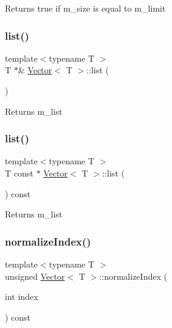 \begin{DoxyReturn}{Returns}
true if m\+\_\+size is equal to m\+\_\+limit 
\end{DoxyReturn}
\mbox{\label{classVector_aad3f85e26470d99139e3f96053bdacc4}} 
\subsubsection{\texorpdfstring{list()}{list()}\hspace{0.1cm}{\footnotesize\ttfamily [1/2]}}
{\footnotesize\ttfamily template$<$typename T $>$ \\
T $\ast$\& \hyperlink{classVector}{Vector}$<$ T $>$\+::list (\begin{DoxyParamCaption}{ }\end{DoxyParamCaption})\hspace{0.3cm}{\ttfamily [protected]}}

\begin{DoxyReturn}{Returns}
m\+\_\+list 
\end{DoxyReturn}
\mbox{\label{classVector_a2aaf129778179680e5932d96aa5471eb}} 
\subsubsection{\texorpdfstring{list()}{list()}\hspace{0.1cm}{\footnotesize\ttfamily [2/2]}}
{\footnotesize\ttfamily template$<$typename T $>$ \\
T const  $\ast$ \hyperlink{classVector}{Vector}$<$ T $>$\+::list (\begin{DoxyParamCaption}{ }\end{DoxyParamCaption}) const\hspace{0.3cm}{\ttfamily [protected]}}

\begin{DoxyReturn}{Returns}
m\+\_\+list 
\end{DoxyReturn}
\mbox{\label{classVector_a63f7ddd7328b13bc30b2243b50f70ec9}} 
\subsubsection{\texorpdfstring{normalize\+Index()}{normalizeIndex()}}
{\footnotesize\ttfamily template$<$typename T $>$ \\
unsigned \hyperlink{classVector}{Vector}$<$ T $>$\+::normalize\+Index (\begin{DoxyParamCaption}\item[{int}]{index }\end{DoxyParamCaption}) const\hspace{0.3cm}{\ttfamily [private]}}

